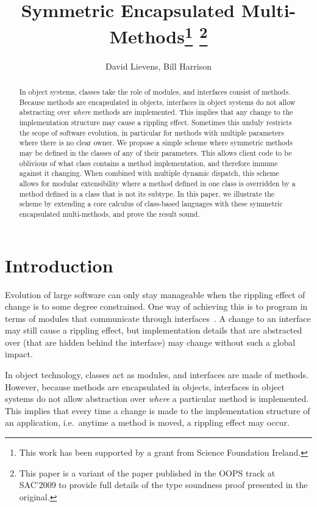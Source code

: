 \documentclass[11pt]{article}
\title{Symmetric Encapsulated Multi-Methods\footnote{This work has been supported by a grant from Science Foundation Ireland.}  \footnote{This paper is a variant of the paper published in the OOPS track at SAC'2009 to provide full details of the type soundness proof presented in the original.}}
\author{David Lievens, Bill Harrison}
\date{}
\begin{document}
\maketitle


\begin{abstract}
In object systems, classes take the role of modules, and interfaces consist of methods. 
Because methods are encapsulated in objects, interfaces in object systems do not allow abstracting over \emph{where} methods are implemented. This implies that any change to the implementation structure may cause a rippling effect. Sometimes this unduly restricts the scope of software evolution, in particular for methods with multiple parameters where there is no clear owner. We propose a simple scheme where symmetric methods may be defined in the classes of any of their parameters. This allows client code to be oblivious of what class contains a method implementation, and therefore immune against it changing. When combined with multiple dynamic dispatch, this scheme allows for modular extensibility where a method defined in one class is overridden by a method defined in a class that is not its subtype. In this paper, we illustrate the scheme by extending a core calculus of class-based languages with these symmetric encapsulated multi-methods, and prove the result sound.
\end{abstract}


\newcommand{\sepbar}{\enskip | \enskip}
\newcommand{\eval}[2]{\ensuremath{#1 \rightarrow #2}}
\newcommand{\type}[3]{\ensuremath{#1 \vdash #2 : #3}}
\newcommand{\evalstar}[2]{\ensuremath{#1 \rightarrow^* #2}}



\section{Introduction}

Evolution of large software can only stay manageable when the rippling effect of change is to some degree constrained. One way of achieving this is to program in terms of modules that communicate through interfaces~\cite{parnasmodules}. A change to an interface may still cause a rippling effect, but implementation details that are abstracted over (that are hidden behind the interface) may change without such a global impact. 

In object technology, classes act as modules, and interfaces are made of methods. However, because methods are encapsulated in objects, interfaces in object systems do not allow abstraction over \emph{where} a particular method is implemented. This implies that every time a change is made to the implementation structure of an application, i.e.~anytime a method is moved, a rippling effect may occur. 
\end{document}
